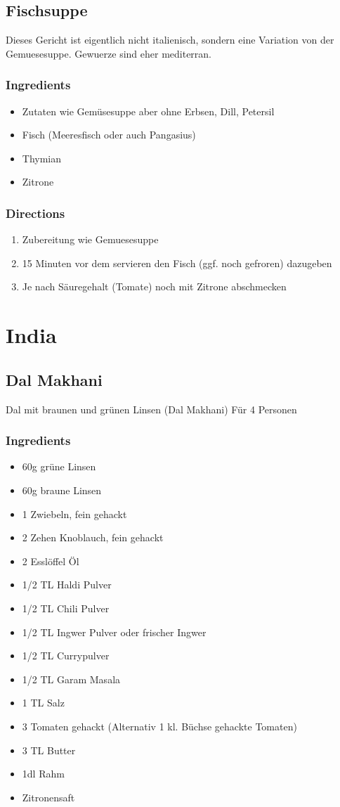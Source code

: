 \subsection{Fischsuppe}
Dieses Gericht ist eigentlich nicht italienisch, sondern eine Variation von der Gemuesesuppe. Gewuerze sind eher mediterran.
\subsubsection*{Ingredients}
\begin{itemize}
\item[] Zutaten wie Gemüsesuppe aber ohne Erbsen, Dill, Petersil
\item[] Fisch (Meeresfisch oder auch Pangasius)
\item[] Thymian
\item[] Zitrone
\end{itemize}
\subsubsection*{Directions}
\begin{enumerate}
\item Zubereitung wie Gemuesesuppe
\item 15 Minuten vor dem servieren den Fisch (ggf. noch gefroren) dazugeben
\item Je nach Säuregehalt (Tomate) noch mit Zitrone abschmecken
\end{enumerate}
\pagebreak

\section{India}
\subsection{Dal Makhani}
Dal mit braunen und grünen Linsen (Dal Makhani) Für 4 Personen 
\subsubsection*{Ingredients}
\begin{itemize}
\item[] 60g grüne Linsen 
\item[] 60g braune Linsen 
\item[] 1 Zwiebeln, fein gehackt 
\item[] 2 Zehen Knoblauch, fein gehackt 
\item[] 2 Esslöffel Öl 
\item[] 1/2 TL Haldi Pulver 
\item[] 1/2 TL Chili Pulver 
\item[] 1/2 TL Ingwer Pulver oder frischer Ingwer 
\item[] 1/2 TL Currypulver 
\item[] 1/2 TL Garam Masala 
\item[] 1 TL Salz 
\item[] 3 Tomaten gehackt (Alternativ 1 kl. Büchse gehackte Tomaten) 
\item[] 3 TL Butter 
\item[] 1dl Rahm 
\item[] Zitronensaft 
\end{itemize}

